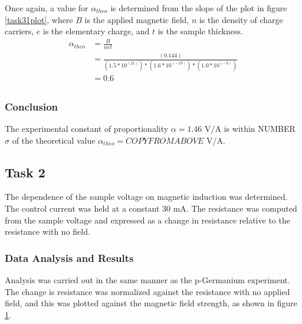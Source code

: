 \documentclass[a4paper]{article}
\begin{document}
\qq Once again, a value for $\alpha_{theo}$ is determined from the
slope of the plot in figure \ref{task31plot}, where $B$ is the applied
magnetic field, $n$ is the density of charge carriers, $e$ is the
elementary charge, and $t$ is the sample thickness.
\begin{align*}
\alpha_{theo} &= \frac{B}{net} \\
              &= \frac{(0.144)}{(1.5 * 10^(21))*(1.6 * 10^(-19))*(1.0 * 10^(-3))} \\
			  &= 0.6 \\
\end{align*}

\subsubsection{Conclusion}
The experimental constant of proportionality $\alpha = 1.46 $ V/A is within NUMBER $\sigma$ of the theoretical value $\alpha_{theo} = COPYFROMABOVE$ V/A.

\subsection{Task 2}

\qq The dependence of the sample voltage on magnetic induction was
determined. The control current was held at a constant 30 mA. The
resistance was computed from the sample voltage and expressed as a
change in resistance relative to the resistance with no field.

\subsubsection{Data Analysis and Results}
\qq Analysis was carried out in the same manner as the p-Germanium
experiment. The change is resistance was normalized against the
resistance with no applied field, and this was plotted against the
magnetic field strength, as shown in figure \ref{task32plot}.

\begin{figure}[H]
\centering
\label{task32plot}
\end{figure}
\end{document}
